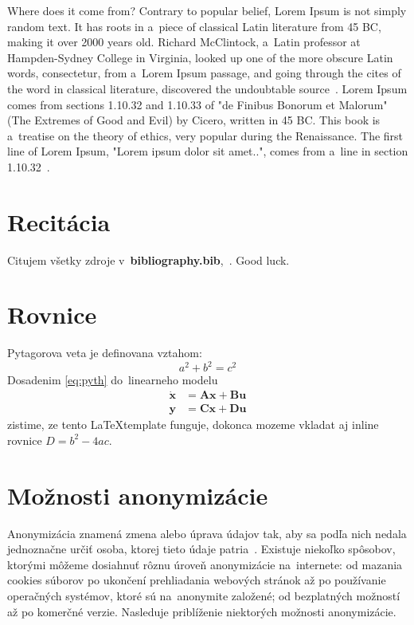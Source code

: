 Where does it come from? Contrary to popular belief, Lorem Ipsum is not simply random text. It has roots in a~piece of classical Latin literature from 45 BC, making it over 2000 years old. Richard McClintock, a~Latin professor at Hampden-Sydney College in Virginia, looked up one of the more obscure Latin words, consectetur, from a~Lorem Ipsum passage, and going through the cites of the word in classical literature, discovered the undoubtable source~\cite{lipsum}. Lorem Ipsum comes from sections 1.10.32 and 1.10.33 of "de Finibus Bonorum et Malorum" (The Extremes of Good and Evil) by Cicero, written in 45 BC. This book is a~treatise on the theory of ethics, very popular during the Renaissance. The first line of Lorem Ipsum, "Lorem ipsum dolor sit amet..", comes from a~line in section 1.10.32~\cite{lipsum}.

\section{Recitácia}
Citujem všetky zdroje v~\textbf{bibliography.bib},~\cite{t00, t01, t02, t03, kniha, kniha2, kniha3, small, big, cs, koll, kap, tug, knuth, zbornik, prispevok}. \newline Good luck.

\section{Rovnice}
Pytagorova veta je definovana vztahom:
\begin{equation}
	a^2 + b^2 = c^2
	\label{eq:pyth}
\end{equation}
Dosadenim \eqref{eq:pyth} do~linearneho modelu
\begin{align}
	\dot{\mathbf{x}} &= \mathbf{A} \mathbf{x} + \mathbf{B} \mathbf{u} \\
	\mathbf{y} &= \mathbf{C} \mathbf{x} + \mathbf{D} \mathbf{u}
	\label{eq:model}
\end{align}
zistime, ze tento \LaTeX template funguje, dokonca mozeme vkladat aj inline rovnice $D = b^2 - 4ac$.


\section{Možnosti anonymizácie}
\noindent Anonymizácia znamená zmena alebo úprava údajov tak, aby sa podľa nich nedala jednoznačne určiť osoba, ktorej tieto údaje patria~\cite{t01}. Existuje niekoľko spôsobov, ktorými môžeme dosiahnuť rôznu úroveň anonymizácie na~internete: od mazania cookies súborov po ukončení prehliadania webových stránok až po používanie operačných systémov, ktoré sú na~anonymite založené; od bezplatných možností až po komerčné verzie.
\newline Nasleduje priblíženie niektorých možnosti anonymizácie.


